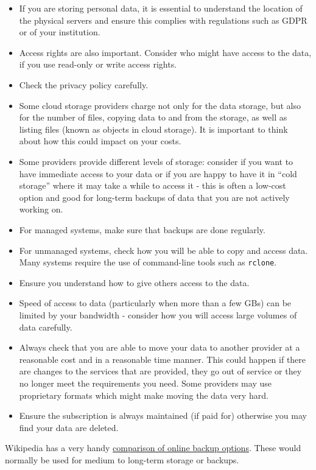 \documentclass[12pt,a4paper,oneside]{report}
\providecommand{\tightlist}{%
  \setlength{\itemsep}{0pt}\setlength{\parskip}{0pt}}
\begin{document}
\begin{itemize}
\tightlist
\item
  If you are storing personal data, it is essential to understand the
  location of the physical servers and ensure this complies with
  regulations such as GDPR or of your institution.
\item
  Access rights are also important. Consider who might have access to
  the data, if you use read-only or write access rights.
\item
  Check the privacy policy carefully.
\item
  Some cloud storage providers charge not only for the data storage, but
  also for the number of files, copying data to and from the storage, as
  well as listing files (known as objects in cloud storage). It is
  important to think about how this could impact on your costs.
\item
  Some providers provide different levels of storage: consider if you
  want to have immediate access to your data or if you are happy to have
  it in ``cold storage'' where it may take a while to access it - this
  is often a low-cost option and good for long-term backups of data that
  you are not actively working on.
\item
  For managed systems, make sure that backups are done regularly.
\item
  For unmanaged systems, check how you will be able to copy and access
  data. Many systems require the use of command-line tools such as
  \texttt{rclone}.
\item
  Ensure you understand how to give others access to the data.
\item
  Speed of access to data (particularly when more than a few GBs) can be
  limited by your bandwidth - consider how you will access large volumes
  of data carefully.
\item
  Always check that you are able to move your data to another provider
  at a reasonable cost and in a reasonable time manner. This could
  happen if there are changes to the services that are provided, they go
  out of service or they no longer meet the requirements you need. Some
  providers may use proprietary formats which might make moving the data
  very hard.
\item
  Ensure the subscription is always maintained (if paid for) otherwise
  you may find your data are deleted.
\end{itemize}

Wikipedia has a very handy
\href{https://en.wikipedia.org/wiki/Comparison_of_online_backup_services}{comparison
of online backup options}. These would normally be used for medium to
long-term storage or backups.
\end{document}
